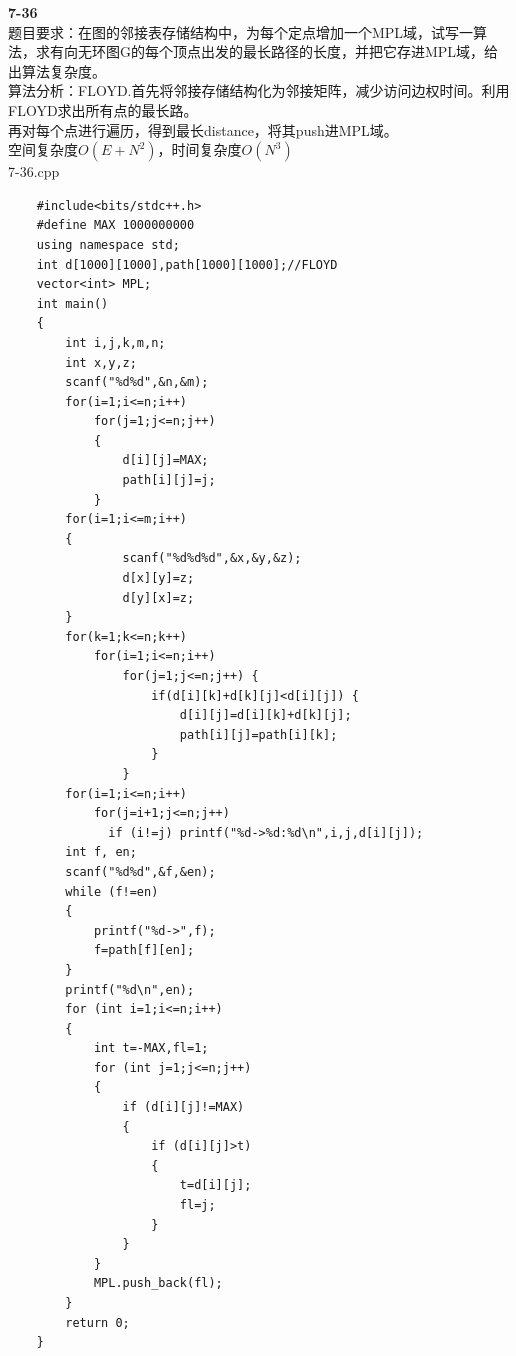 \documentclass[UTF8,a4paper]{article}
\begin{document}
\textbf{7-36}\\
题目要求：在图的邻接表存储结构中，为每个定点增加一个MPL域，试写一算法，求有向无环图G的每个顶点出发的最长路径的长度，并把它存进MPL域，给出算法复杂度。\\
算法分析：FLOYD.首先将邻接存储结构化为邻接矩阵，减少访问边权时间。利用FLOYD求出所有点的最长路。\\
再对每个点进行遍历，得到最长distance，将其push进MPL域。\\
空间复杂度$O(E+N^2)$，时间复杂度$O(N^3)$\\
7-36.cpp\\
\begin{lstlisting}
    #include<bits/stdc++.h>
    #define MAX 1000000000
    using namespace std;
    int d[1000][1000],path[1000][1000];//FLOYD
    vector<int> MPL;
    int main()
    {
        int i,j,k,m,n;
        int x,y,z;
        scanf("%d%d",&n,&m);
        for(i=1;i<=n;i++)
            for(j=1;j<=n;j++)
            {
                d[i][j]=MAX;
                path[i][j]=j;
            }
        for(i=1;i<=m;i++)
        {
                scanf("%d%d%d",&x,&y,&z);
                d[x][y]=z;
                d[y][x]=z;
        }
        for(k=1;k<=n;k++)
            for(i=1;i<=n;i++)
                for(j=1;j<=n;j++) {
                    if(d[i][k]+d[k][j]<d[i][j]) {
                        d[i][j]=d[i][k]+d[k][j];
                        path[i][j]=path[i][k];
                    }
                }
        for(i=1;i<=n;i++)
            for(j=i+1;j<=n;j++)
              if (i!=j) printf("%d->%d:%d\n",i,j,d[i][j]);
        int f, en;
        scanf("%d%d",&f,&en);
        while (f!=en)
        {
            printf("%d->",f);
            f=path[f][en];
        }
        printf("%d\n",en);
        for (int i=1;i<=n;i++)
        {
            int t=-MAX,fl=1;
            for (int j=1;j<=n;j++)
            {
                if (d[i][j]!=MAX)
                {
                    if (d[i][j]>t) 
                    {
                        t=d[i][j];
                        fl=j;
                    }
                }
            }
            MPL.push_back(fl);
        }
        return 0;
    }     
\end{lstlisting}
\end{document}
